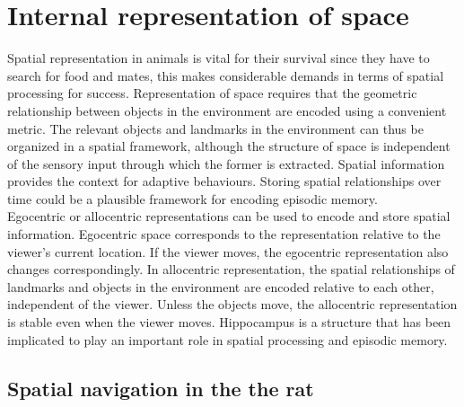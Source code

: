 
\section{Internal representation of space} %

\label{space} 


Spatial representation in animals is vital for their survival since they have to search for food and mates, this makes considerable demands in terms of spatial processing for success. Representation of space requires that the geometric relationship between objects in the environment are encoded using a convenient metric. The relevant objects and landmarks in the environment can thus be organized in a spatial framework, although the structure of space is independent of the sensory input through which the former is extracted. Spatial information provides the context for adaptive behaviours. Storing spatial relationships over time could be a plausible framework for encoding episodic memory. \\
Egocentric or allocentric representations can be used to encode and store spatial information. Egocentric space corresponds to the representation relative to the viewer's current location. If the viewer moves, the egocentric representation also changes correspondingly. In allocentric representation, the spatial relationships of landmarks and objects in the environment are encoded relative to each other, independent of the viewer. Unless the objects move, the allocentric representation is stable even when the viewer moves. Hippocampus is a structure that has been implicated to play an important role in spatial processing and episodic memory. 
\subsection{Spatial navigation in the the rat}


